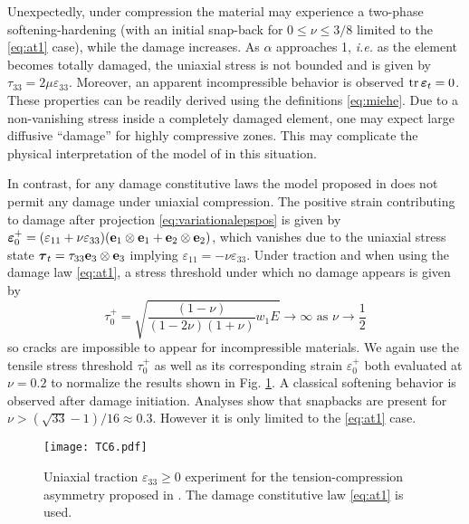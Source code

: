 Unexpectedly, under compression the material may experience a two-phase softening-hardening (with an initial snap-back for $0\leq \nu\leq 3/8$ limited to the \eqref{eq:at1} case), while the damage increases. As $\alpha$ approaches 1, \emph{i.e.} as the element becomes totally damaged, the uniaxial stress is not bounded and is given by $\tau_{33}=2\mu\varepsilon_{33}$. Moreover, an apparent incompressible behavior is observed $\tr\eps_t=0$. These properties can be readily derived using the definitions \eqref{eq:miehe}. Due to a non-vanishing stress inside a completely damaged element, one may expect large diffusive ``damage'' for highly compressive zones. This may complicate the physical interpretation of the model of \cite{MieheHofackerWelschinger:2010} in this situation.

In contrast, for any damage constitutive laws the model proposed in \cite{FreddiRoyer-Carfagni:2010} does not permit any damage under uniaxial compression. The positive strain contributing to damage after projection \eqref{eq:variationalepspos} is given by $\eps_0^+=(\varepsilon_{11}+\nu\varepsilon_{33})(\vec{e}_1\otimes\vec{e}_1+\vec{e}_2\otimes\vec{e}_2)$, which vanishes due to the uniaxial stress state $\vtau_t=\tau_{33}\vec{e}_3\otimes\vec{e}_3$ implying $\varepsilon_{11}=-\nu\varepsilon_{33}$. Under traction and when using the damage law \eqref{eq:at1}, a stress threshold under which no damage appears is given by
\[
\tau_0^+=\sqrt{\frac{(1-\nu)}{(1-2\nu)(1+\nu)}w_1E}\to\infty\text{ as $\nu\to\frac{1}{2}$}
\]
so cracks are impossible to appear for incompressible materials. We again use the tensile stress threshold $\tau_0^+$ as well as its corresponding strain $\varepsilon_0^+$ both evaluated at $\nu=0.2$ to normalize the results shown in Fig. \ref{fig:freddi}. A classical softening behavior is observed after damage initiation. Analyses show that snapbacks are present for $\nu>(\sqrt{33}-1)/16\approx 0.3$. However it is only limited to the \eqref{eq:at1} case.
\begin{figure}[htbp]
\centering
\texttt{[image: TC6.pdf]}
\caption{Uniaxial traction $\varepsilon_{33}\geq 0$ experiment for the tension-compression asymmetry proposed in \cite{FreddiRoyer-Carfagni:2010}. The damage constitutive law \eqref{eq:at1} is used.} \label{fig:freddi}
\end{figure}

